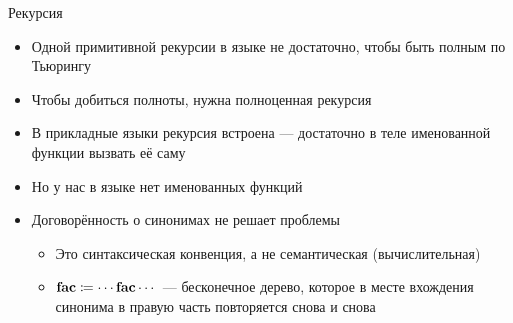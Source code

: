 
    \begin{frame}{Рекурсия}
        \begin{itemize}
            \item Одной примитивной рекурсии в языке не достаточно, чтобы быть полным по Тьюрингу
            \item Чтобы добиться полноты, нужна полноценная рекурсия
            \item  В прикладные языки рекурсия встроена --- достаточно в теле именованной функции вызвать её саму
            \item Но у нас в языке нет именованных функций
            \item Договорённость о синонимах не решает проблемы
            \begin{itemize}
                \item Это синтаксическая конвенция, а не семантическая (вычислительная)
                \item $\mathbf{fac} \coloneqq \cdots \mathbf{fac} \cdots$ --- бесконечное дерево, которое в месте вхождения синонима в правую часть повторяется снова и снова
            \end{itemize}
        \end{itemize}
    \end{frame}

